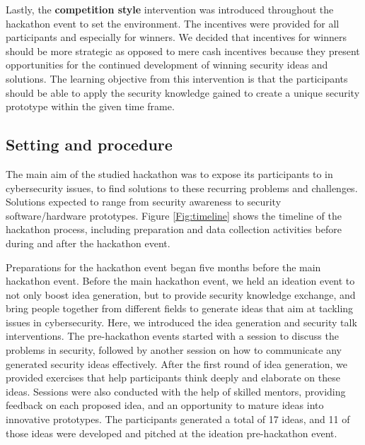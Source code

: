 \documentclass[runningheads]{llncs}
\begin{document}
Lastly, the \textbf{competition style} intervention was introduced throughout the hackathon event to set the environment. The incentives were provided for all participants and especially for winners. We decided that incentives for winners should be more strategic as opposed to mere cash incentives because they present opportunities for the continued development of winning security ideas and solutions. The learning objective from this intervention is that the participants should be able to apply the security knowledge gained to create a unique security prototype within the given time frame.

\subsection{Setting and procedure}
The main aim of the studied hackathon was to expose its participants to in cybersecurity issues, to find solutions to these recurring problems and challenges. Solutions expected to range from security awareness to security software/hardware prototypes. Figure \ref{Fig:timeline} shows the timeline of the hackathon process, including preparation and data collection activities before during and after the hackathon event.

Preparations for the hackathon event began five months before the main hackathon event. Before the main hackathon event, we held an ideation event to not only boost idea generation, but to provide security knowledge exchange, and bring people together from different fields to generate ideas that aim at tackling issues in cybersecurity. Here, we introduced the idea generation and security talk interventions. The pre-hackathon events started with a session to discuss the problems in security, followed by another session on how to communicate any generated security ideas effectively. After the first round of idea generation, we provided exercises that help participants think deeply and elaborate on these ideas. Sessions were also conducted with the help of skilled mentors, providing feedback on each proposed idea, and an opportunity to mature ideas into innovative prototypes. The participants generated a total of 17 ideas, and 11 of those ideas were developed and pitched at the ideation pre-hackathon event. 
\end{document}

